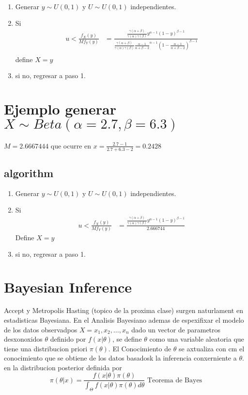 \documentclass[10pt, oneside]{article}
\begin{document}
\begin{enumerate}
	\item Generar $y \sim U(0,1)$ y $U \sim U(0,1)$ independientes.
	\item Si
	      \[
		      \begin{split}
			      u < \frac{f_X(y)}{M f_Y(y)} & = \frac{\frac{\gamma(\alpha + \beta)}{\gamma(\alpha)\gamma(\beta)}y^{\alpha - 1}(1-y)^{\beta-1}}
			      {\frac{\gamma(\alpha + \beta)}{\gamma(\alpha)\gamma(\beta)} \frac{\alpha - 1}{\alpha + \beta - 2}^{\alpha - 1}(1-\frac{\alpha - 1}{\alpha + \beta - 2})^{\beta-1}} \\
		      \end{split}
	      \]
	      define $X=y$
	\item si no, regresar a paso 1.
\end{enumerate}

\section{Ejemplo generar $X \sim Beta( \alpha=2.7, \beta=6.3)$}

$M= 2.6667444$  que ocurre en $x = \frac{2.7 - 1}{2.7 + 6.3 - 2} = 0.2428$

\subsection{algorithm}

\begin{enumerate}
	\item Generar $y \sim U(0,1)$ y $U \sim U(0,1)$ independientes.
	\item Si
	      \[
		      \begin{split}
			      u < \frac{f_X(y)}{M f_Y(y)} & = \frac{\frac{\gamma(\alpha + \beta)}{\gamma(\alpha)\gamma(\beta)}y^{\alpha - 1}(1-y)^{\beta-1}}
			      {2.666744}
		      \end{split}
	      \]
	      Define $X=y$
	\item si no, regresar a paso 1.
\end{enumerate}


\section{Bayesian Inference}

Accept y Metropolis Hasting (topico de la proxima clase) surgen naturlament en estadisticas Bayesiana. En el Analisis Bayesiano
ademas de espexifixar el modelo de los datos observadpos $X = x_1, x_2, \ldots, x_n$ dado un vector de parametros desxonoxidos $\theta$
definido por $f(x|\theta)$, se define $\theta$ como una variable aleatoria que tiene una distribucion priori $\pi(\theta)$. El
Conocimiento de $\theta$ se axtualiza con cm el conocimiento que se obtiene de los datos basadosk la inferencia conxerniente a $\theta$.
en la distribucion posterior definida por
$$
	\pi(\theta|x) = \frac{f(x|\theta) \pi(\theta)}{\int_{\Theta} f(x|\theta) \pi(\theta) d\theta} \text{ Teorema de Bayes}
$$
\end{document}
